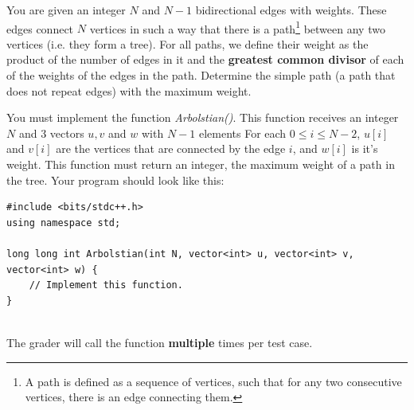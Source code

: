 \documentclass[12pt]{scrartcl}
\begin{document}
    
    
    \vspace{10pt}

    
    
        You are given an integer $N$ and $N - 1$ bidirectional edges with weights. These edges connect $N$ vertices in such a way that there is a path\footnote{A path is defined as a sequence of vertices, such that for any two consecutive vertices, there is an edge connecting them.} between any two vertices (i.e. they form a tree). For all paths, we define their weight as the product of the number of edges in it and the {\bfseries greatest common divisor} of each of the weights of the edges in the path. Determine the simple path (a path that does not repeat edges) with the maximum weight.
    

        You must implement the function \textit{Arbolstian()}. This function receives an integer $N$ and 3 vectors $u, v$ and $w$ with $N - 1$ elements For each $0 \le i \le N - 2$, $u[i]$ and $v[i]$ are the vertices that are connected by the edge $i$, and $w[i]$ is it's weight. This function must return an integer, the maximum weight of a path in the tree.
        Your program should look like this:

\begin{verbatim}
#include <bits/stdc++.h>
using namespace std;

long long int Arbolstian(int N, vector<int> u, vector<int> v, vector<int> w) {
    // Implement this function.
}
    
\end{verbatim}

    The grader will call the function \textbf{multiple} times per test case.

    
\end{document}
